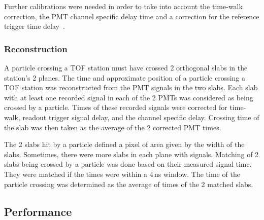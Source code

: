 Further calibrations were needed in order to take into account the
time-walk correction, the PMT channel specific delay time and
a correction for the reference trigger time delay~\cite{NOTE251}.

\subsubsection{Reconstruction}

A particle crossing a TOF station must have crossed 2 orthogonal slabs
in the station's 2 planes.  The time and approximate position of
a particle crossing a TOF station was reconstructed from the PMT signals
in the two slabs. Each slab with at least one recorded signal in each
of the 2 PMTs was considered as being crossed by a
particle. Times of these recorded signals were corrected for
time-walk, readout trigger signal delay, and the channel specific
delay. Crossing time of the slab was then taken as the average of
the 2 corrected PMT times.

The 2 slabs hit by a particle defined a pixel of area given by the
width of the slabs. Sometimes, there were more slabs in each plane
with signals. Matching of 2 slabs being crossed by a particle was done
based on their measured signal time. They were matched if the times
were within a 4\,ns window. The time of the particle crossing was
determined as the average of times of the 2 matched slabs.


\subsection{Performance}
\label{SubSect:TOF_Performance}


